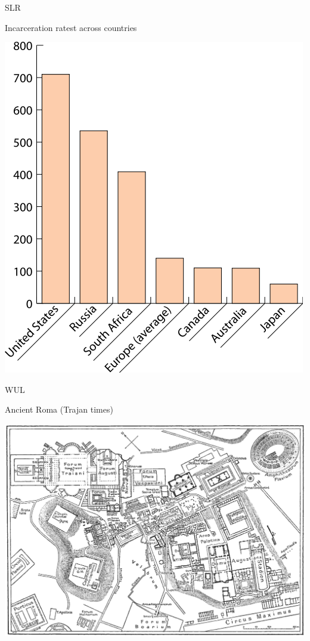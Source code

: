 \begin{chart}{S}{LR}
\caption{Incarceration ratest across countries}
\label{chart:incarceration}
\includegraphics[width=\chartwidth,height=\chartheight]{incarceration}  
\end{chart}

\begin{map}{W}{UL}
\caption{Ancient Roma  (Trajan times)}
\label{map:roma}
\includegraphics[width=\chartwidth,height=\chartheight]{Rome}
\end{map}



